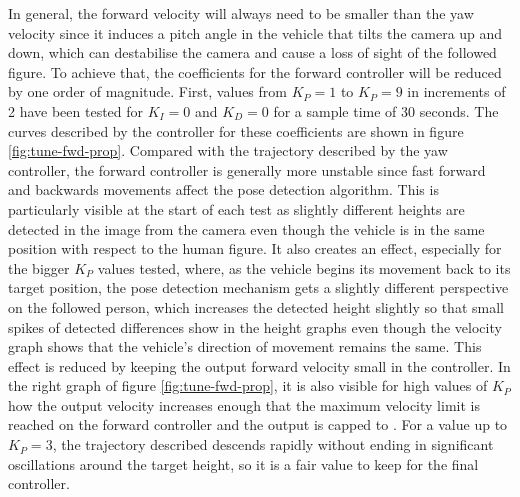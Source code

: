 In general, the forward velocity will always need to be smaller than the yaw velocity since it induces a pitch angle in the vehicle that tilts the camera up and down, which can destabilise the camera and cause a loss of sight of the followed figure.
To achieve that, the coefficients for the forward controller will be reduced by one order of magnitude.
First, values from $K_P=1$ to $K_P=9$ in increments of 2 have been tested for $K_I=0$ and $K_D=0$ for a sample time of 30 seconds.
The curves described by the controller for these coefficients are shown in figure \ref{fig:tune-fwd-prop}.
Compared with the trajectory described by the yaw controller, the forward controller is generally more unstable since fast forward and backwards movements affect the pose detection algorithm.
This is particularly visible at the start of each test as slightly different heights are detected in the image from the camera even though the vehicle is in the same position with respect to the human figure.
It also creates an effect, especially for the bigger $K_P$ values tested, where, as the vehicle begins its movement back to its target position, the pose detection mechanism gets a slightly different perspective on the followed person, which increases the detected height slightly so that small spikes of detected differences show in the height graphs even though the velocity graph shows that the vehicle's direction of movement remains the same.
This effect is reduced by keeping the output forward velocity small in the controller.
In the right graph of figure \ref{fig:tune-fwd-prop}, it is also visible for high values of $K_P$ how the output velocity increases enough that the maximum velocity limit is reached on the forward controller and the output is capped to .
For a value up to $K_P=3$, the trajectory described descends rapidly without ending in significant oscillations around the target height, so it is a fair value to keep for the final controller.


